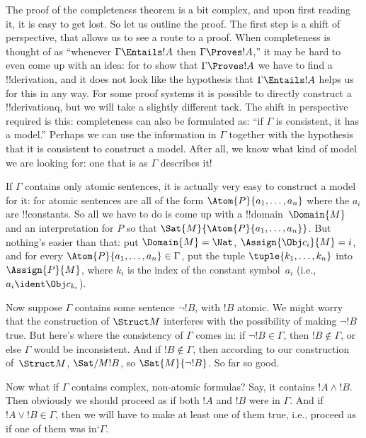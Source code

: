 \documentclass[../../include/open-logic-section]{subfiles}
\begin{document}


The proof of the completeness theorem is a bit complex, and upon first
reading it, it is easy to get lost.  So let us outline the proof.  The
first step is a shift of perspective, that allows us to see a route to
a proof.  When completeness is thought of as ``whenever $\Gamma
\Entails !A$ then $\Gamma \Proves !A$,'' it may be hard to even come up
with an idea: for to show that $\Gamma \Proves !A$ we have to find a
!!{derivation}, and it does not look like the hypothesis that $\Gamma
\Entails !A$ helps us for this in any way.  For some proof systems it
is possible to directly construct a !!{derivation}q, but we will take
a slightly different tack.  The shift in perspective required is this:
completeness can also be formulated as: ``if $\Gamma$ is consistent, it
has a model.''  Perhaps we can use the information in $\Gamma$ together
with the hypothesis that it is consistent to construct a model.  After
all, we know what kind of model we are looking for: one that is as
$\Gamma$ describes it!

If $\Gamma$ contains only atomic sentences, it is actually very easy
to construct a model for it: for atomic sentences are all of the form
$\Atom{P}{a_1,\dots,a_n}$ where the $a_i$ are !!{constant}s.  So all
we have to do is come up with a !!{domain}~$\Domain{M}$ and an
interpretation for $P$ so that
$\Sat{M}{\Atom{P}{a_1,\ldots,a_n}}$. But nothing's easier than that:
put $\Domain{M} = \Nat$, $\Assign{\Obj c_i}{M} = i$, and for every
$\Atom{P}{a_1,\ldots,a_n} \in \Gamma$, put the tuple $\tuple{k_1,
  \dots, k_n}$ into $\Assign{P}{M}$, where $k_i$ is the index of the
constant symbol~$a_i$ (i.e., $a_i \ident \Obj c_{k_i}$).

Now suppose $\Gamma$ contains some sentence $\lnot !B$, with $!B$
atomic.  We might worry that the construction of $\Struct M$
interferes with the possibility of making $\lnot !B$ true.  But here's
where the consistency of $\Gamma$ comes in: if $\lnot !B \in \Gamma$,
then $!B \notin \Gamma$, or else $\Gamma$ would be inconsistent.  And
if $!B \notin \Gamma$, then according to our construction of~$\Struct M$,
$\Sat/{M}{!B}$, so $\Sat{M}{\lnot !B}$.  So far so good.

Now what if $\Gamma$ contains complex, non-atomic formulas? Say, it
contains $!A \land !B$. Then obviously
we should proceed as if both $!A$ and $!B$ were in $\Gamma$.  And if
$!A \lor !B \in \Gamma$, then we will have to make at least one of
them true, i.e., proceed as if one of them was in`$\Gamma$.
\end{document}
